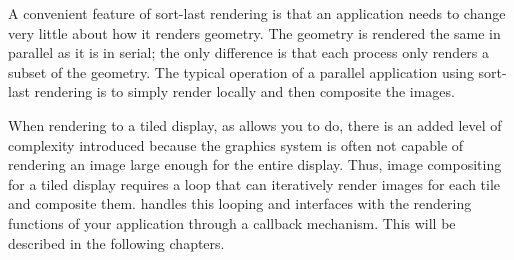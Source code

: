 A convenient feature of sort-last rendering is that an application needs to
change very little about how it renders geometry.  The geometry is rendered
the same in parallel as it is in serial; the only difference is that each
process only renders a subset of the geometry.  The typical operation of a
parallel application using sort-last rendering is to simply render locally
and then composite the images.

When rendering to a tiled display, as \IceT allows you to do, there is an
added level of complexity introduced because the graphics system is often
not capable of rendering an image large enough for the entire display.
Thus, image compositing for a tiled display requires a loop that can
iteratively render images for each tile and composite them.  \IceT handles
this looping and interfaces with the rendering functions of your
application through a callback mechanism.  This will be described in the
following chapters.
